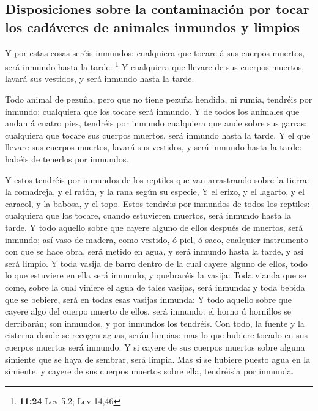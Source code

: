\hypertarget{disposiciones-sobre-la-contaminaciuxf3n-por-tocar-los-caduxe1veres-de-animales-inmundos-y-limpios}{%
\subsection{Disposiciones sobre la contaminación por tocar los cadáveres
de animales inmundos y
limpios}\label{disposiciones-sobre-la-contaminaciuxf3n-por-tocar-los-caduxe1veres-de-animales-inmundos-y-limpios}}

 Y por estas cosas seréis inmundos: cualquiera que tocare á
sus cuerpos muertos, será inmundo hasta la tarde: \footnote{\textbf{11:24}
  Lev 5,2; Lev 14,46}  Y cualquiera que llevare de sus
cuerpos muertos, lavará sus vestidos, y será inmundo hasta la tarde.

 Todo animal de pezuña, pero que no tiene pezuña hendida,
ni rumia, tendréis por inmundo: cualquiera que los tocare será inmundo.
 Y de todos los animales que andan á cuatro pies, tendréis
por inmundo cualquiera que ande sobre sus garras: cualquiera que tocare
sus cuerpos muertos, será inmundo hasta la tarde.  Y el que
llevare sus cuerpos muertos, lavará sus vestidos, y será inmundo hasta
la tarde: habéis de tenerlos por inmundos.

 Y estos tendréis por inmundos de los reptiles que van
arrastrando sobre la tierra: la comadreja, y el ratón, y la rana según
su especie,  Y el erizo, y el lagarto, y el caracol, y la
babosa, y el topo.  Estos tendréis por inmundos de todos
los reptiles: cualquiera que los tocare, cuando estuvieren muertos, será
inmundo hasta la tarde.  Y todo aquello sobre que cayere
alguno de ellos después de muertos, será inmundo; así vaso de madera,
como vestido, ó piel, ó saco, cualquier instrumento con que se hace
obra, será metido en agua, y será inmundo hasta la tarde, y así será
limpio.  Y toda vasija de barro dentro de la cual cayere
alguno de ellos, todo lo que estuviere en ella será inmundo, y
quebraréis la vasija:  Toda vianda que se come, sobre la
cual viniere el agua de tales vasijas, será inmunda: y toda bebida que
se bebiere, será en todas esas vasijas inmunda:  Y todo
aquello sobre que cayere algo del cuerpo muerto de ellos, será inmundo:
el horno ú hornillos se derribarán; son inmundos, y por inmundos los
tendréis.  Con todo, la fuente y la cisterna donde se
recogen aguas, serán limpias: mas lo que hubiere tocado en sus cuerpos
muertos será inmundo.  Y si cayere de sus cuerpos muertos
sobre alguna simiente que se haya de sembrar, será limpia. 
Mas si se hubiere puesto agua en la simiente, y cayere de sus cuerpos
muertos sobre ella, tendréisla por inmunda.

